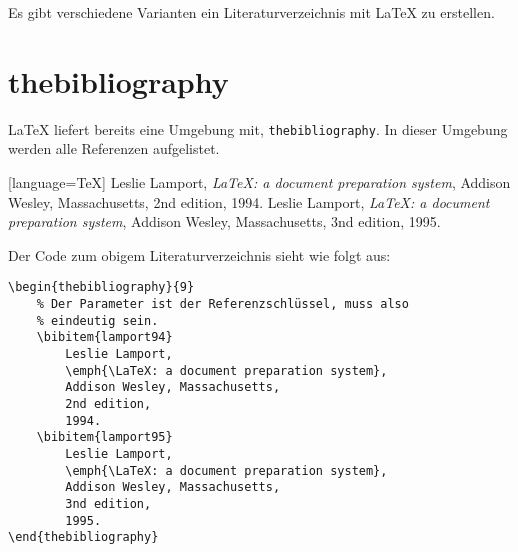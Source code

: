 \documentclass[a4paper]{article}
\begin{document}
Es gibt verschiedene Varianten ein Literaturverzeichnis mit \LaTeX{} zu
erstellen.
\section{thebibliography}
\LaTeX{} liefert bereits eine Umgebung mit, \verb+thebibliography+. In dieser
Umgebung werden alle Referenzen aufgelistet.
\begin{thebibliography}{9}
	[language=TeX]
		Leslie Lamport,
		\emph{\LaTeX: a document preparation system},
		Addison Wesley, Massachusetts,
		2nd edition,
		1994.
		Leslie Lamport,
		\emph{\LaTeX: a document preparation system},
		Addison Wesley, Massachusetts,
		3nd edition,
		1995.
\end{thebibliography}

Der Code zum obigem Literaturverzeichnis sieht wie folgt aus:
\begin{lstlisting}
\begin{thebibliography}{9}
	% Der Parameter ist der Referenzschlüssel, muss also
	% eindeutig sein.
	\bibitem{lamport94}
		Leslie Lamport,
		\emph{\LaTeX: a document preparation system},
		Addison Wesley, Massachusetts,
		2nd edition,
		1994.
	\bibitem{lamport95}
		Leslie Lamport,
		\emph{\LaTeX: a document preparation system},
		Addison Wesley, Massachusetts,
		3nd edition,
		1995.
\end{thebibliography}
\end{lstlisting}
\end{document}
